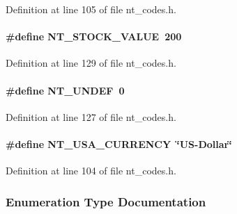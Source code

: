 Definition at line 105 of file nt\_\-codes.h.

\paragraph[{NT\_\-STOCK\_\-VALUE}]{\setlength{\rightskip}{0pt plus 5cm}\#define NT\_\-STOCK\_\-VALUE~200}\hfill\label{nt__codes_8h_a28bdb1d8795df5a7cb247ec936fb585e}


Definition at line 129 of file nt\_\-codes.h.

\paragraph[{NT\_\-UNDEF}]{\setlength{\rightskip}{0pt plus 5cm}\#define NT\_\-UNDEF~0}\hfill\label{nt__codes_8h_a9971dbdfd7fc0cd3f06f161c386ea5d2}


Definition at line 127 of file nt\_\-codes.h.

\paragraph[{NT\_\-USA\_\-CURRENCY}]{\setlength{\rightskip}{0pt plus 5cm}\#define NT\_\-USA\_\-CURRENCY~\char`\"{}US-\/Dollar\char`\"{}}\hfill\label{nt__codes_8h_a0ac0de99dc06963ab0e7322ba742f3bf}


Definition at line 104 of file nt\_\-codes.h.



\subsubsection{Enumeration Type Documentation}
